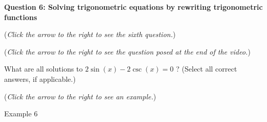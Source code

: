 \documentclass{ximera}
\begin{document}
\textbf{Question 6: Solving trigonometric equations
by rewriting trigonometric functions}
\begin{question}
\begin{flushright}
{\color{blue}(\emph{Click the arrow to the right to see the sixth question.})}
\end{flushright}
\begin{center}
\begin{expandable}
\begin{flushright}
{\color{blue}(\emph{Click the arrow to the right to see the question
posed at the end of the video.})}
\end{flushright}
\begin{expandable}
What are all solutions to $2\sin(x) - 2\csc(x) = 0$
? (Select all correct answers, if applicable.)
\begin{selectAll}
\end{selectAll}
\begin{flushright}
{\color{blue}(\emph{Click the arrow to the right to see an example.})}
\end{flushright}
\begin{expandable}
\begin{center}
Example 6
\end{center}
\end{expandable}
\end{expandable}
\end{expandable}
\end{center}
\end{question}
\end{document}
